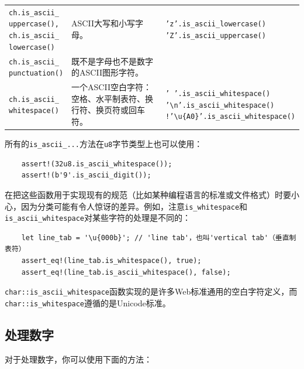 \begin{longtable}{p{}p{}p{}}
    \rowcolor{tablecolor}
    \makecell[l]{\texttt{ch.is\_ascii\_}\\ \texttt{uppercase(),}\\ \texttt{ch.is\_ascii\_}\\ \texttt{lowercase()}} & ASCII大写和小写字母。 &
    \makecell[l]{\texttt{'z'.is\_ascii\_lowercase()}\\ \texttt{'Z'.is\_ascii\_uppercase()}} \\
    \makecell[l]{\texttt{ch.is\_ascii\_}\\ \texttt{punctuation()}} & 既不是字母也不是数字的ASCII图形字符。 & \\
    \rowcolor{tablecolor}
    \makecell[l]{\texttt{ch.is\_ascii\_}\\ \texttt{whitespace()}} & 一个ASCII空白字符：空格、水平制表符、换行符、换页符或回车符。 &
    \makecell[l]{\texttt{' '.is\_ascii\_whitespace()}\\ \texttt{'\textbackslash n'.is\_ascii\_whitespace()}\\ \texttt{!'\textbackslash u\{A0\}'.is\_ascii\_whitespace()}} \\
    \hline
\end{longtable}

所有的\texttt{is\_ascii\_...}方法在\texttt{u8}字节类型上也可以使用：
\begin{verbatim}
    assert!(32u8.is_ascii_whitespace());
    assert!(b'9'.is_ascii_digit());
\end{verbatim}

在把这些函数用于实现现有的规范（比如某种编程语言的标准或文件格式）时要小心，因为分类可能有令人惊讶的差异。例如，注意\texttt{is\_whitespace}和\texttt{is\_ascii\_whitespace}对某些字符的处理是不同的：
\begin{verbatim}
    let line_tab = '\u{000b}'; // 'line tab'，也叫'vertical tab'（垂直制表符）
    assert_eq!(line_tab.is_whitespace(), true);
    assert_eq!(line_tab.is_ascii_whitespace(), false);
\end{verbatim}

\texttt{char::is\_ascii\_whitespace}函数实现的是许多Web标准通用的空白字符定义，而\texttt{char::is\_whitespace}遵循的是Unicode标准。

\subsection{处理数字}

对于处理数字，你可以使用下面的方法：


